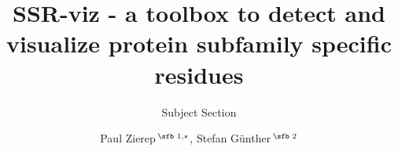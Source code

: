\documentclass{bioinfo}
\begin{document}

\subtitle{Subject Section}

\title[short Title]{SSR-viz - a toolbox to detect and visualize protein
subfamily specific residues}
\author[Sample \textit{et~al}.]{Paul Zierep\,$^{\text{\sfb 1,}*}$, Stefan G\"unther\,$^{\text{\sfb 2}}$}
\address{$^{\text{\sf 1}}$Pharmaceutical Bioinformatics, Institute of Pharmaceutical Science, Albert-Ludwigs-University, Hermann-Herder-Strasse 9, Freiburg 79104, Germany. \\
}



\end{document}
